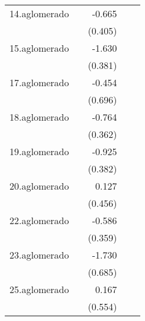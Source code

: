 {\begin{longtable}{l*{4}{D{.}{.}{-1}}}
\addlinespace
14.aglomerado&                     &      -0.665         &                     &                     \\
            &                     &     (0.405)         &                     &                     \\
\addlinespace
15.aglomerado&                     &      -1.630\sym{***}&                     &                     \\
            &                     &     (0.381)         &                     &                     \\
\addlinespace
17.aglomerado&                     &      -0.454         &                     &                     \\
            &                     &     (0.696)         &                     &                     \\
\addlinespace
18.aglomerado&                     &      -0.764\sym{*}  &                     &                     \\
            &                     &     (0.362)         &                     &                     \\
\addlinespace
19.aglomerado&                     &      -0.925\sym{*}  &                     &                     \\
            &                     &     (0.382)         &                     &                     \\
\addlinespace
20.aglomerado&                     &       0.127         &                     &                     \\
            &                     &     (0.456)         &                     &                     \\
\addlinespace
22.aglomerado&                     &      -0.586         &                     &                     \\
            &                     &     (0.359)         &                     &                     \\
\addlinespace
23.aglomerado&                     &      -1.730\sym{*}  &                     &                     \\
            &                     &     (0.685)         &                     &                     \\
\addlinespace
25.aglomerado&                     &       0.167         &                     &                     \\
            &                     &     (0.554)         &                     &                     \\

\end{longtable}}
